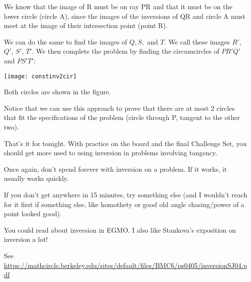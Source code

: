 
We know that the image of R must be on ray PR and that it must be on the lower circle (circle A), since the images of the inversions of QR and circle A must meet at the image of their intersection point (point R).

We can do the same to find the images of $Q, S,$ and $T$.  We call these images $R'$, $Q'$, $S'$, $T'$.  We then complete the problem by finding the circumcircles of $PR'Q'$ and $PS'T'$:

\begin{center}
    \texttt{[image: constinv2cir]}    
\end{center}

Both circles are shown in the figure.

Notice that we can use this approach to prove that there are at most 2 circles that fit the specifications of the problem (circle through P, tangent to the other two).

That's it for tonight.  With practice on the board and the final Challenge Set, you should get more used to using inversion in problems involving tangency.

Once again, don't spend forever with inversion on a problem. If it works, it usually works quickly.

If you don't get anywhere in 15 minutes, try something else (and I wouldn't reach for it first if something else, like homothety or good old angle chasing/power of a point looked good).

You could read about inversion in EGMO. I also like Stankova's exposition on inversion a lot!

See \url{https://mathcircle.berkeley.edu/sites/default/files/BMC6/ps0405/inversionSJ04.pdf}

